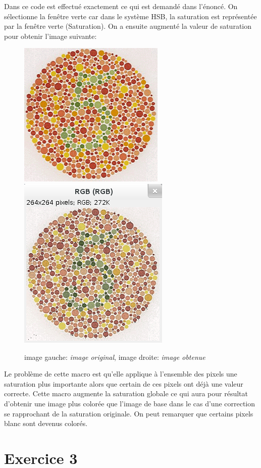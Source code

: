 \documentclass[a4paper,12pt]{report}
\begin{document}
Dans ce code est effectué exactement ce qui est demandé dans l'énoncé. On sélectionne la fenêtre verte car dans le système HSB, la saturation est représentée par la fenêtre verte (Saturation). On a ensuite augmenté la valeur de saturation pour obtenir l'image suivante:

\begin{figure}[!ht]
	\center
	\includegraphics[scale=0.4]{image/E2-41.png}	
	\includegraphics[scale=0.4]{image/E2-4.png}	
	\caption{image gauche: \textit{image original}, image droite: \textit{image obtenue}}
\end{figure} 

Le problème de cette macro est qu'elle applique à l'ensemble des pixels une saturation plus importante alors que certain de ces pixels ont déjà une valeur correcte. Cette macro augmente la saturation globale ce qui aura pour résultat d'obtenir une image plus colorée que l'image de base dans le cas d'une correction se rapprochant de la saturation originale. On peut remarquer que certains pixels blanc sont devenus colorés.

\section*{Exercice 3}
\end{document}
